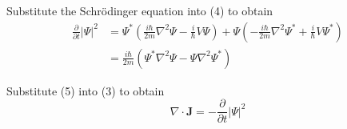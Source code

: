 Substitute the Schr\"odinger equation into (4) to obtain
\begin{align*}
\frac{\partial}{\partial t}|\Psi|^2
&=\Psi^*\left(\frac{i\hbar}{2m}\nabla^2\Psi-\frac{i}{\hbar}V\Psi\right)
+\Psi\left(-\frac{i\hbar}{2m}\nabla^2\Psi^*+\frac{i}{\hbar}V\Psi^*\right)
\\
&=\frac{i\hbar}{2m}\left(\Psi^*\nabla^2\Psi-\Psi\nabla^2\Psi^*\right)
\tag{5}
\end{align*}

Substitute (5) into (3) to obtain
\begin{equation*}
\nabla\cdot\mathbf J=-\frac{\partial}{\partial t}|\Psi|^2
\tag{6}
\end{equation*}


